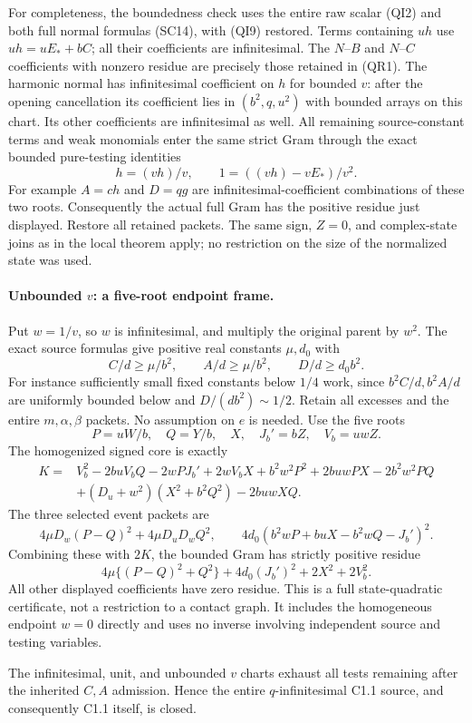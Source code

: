 For completeness, the boundedness check uses the entire raw scalar
(QI2) and both full normal formulas (SC14), with (QI9) restored.
Terms containing $u h$ use $u h=uE_*+bC$; all their coefficients
are infinitesimal. The $N$--$B$ and $N$--$C$ coefficients with
nonzero residue are precisely those retained in (QR1). The harmonic
normal has infinitesimal coefficient on $h$ for bounded $v$:
after the opening cancellation its coefficient lies in
$(b^2,q,u^2)$ with bounded arrays on this chart. Its other
coefficients are infinitesimal as well.
All remaining source-constant terms and weak monomials enter the
same strict Gram through the exact bounded pure-testing identities
\[
                   h=(vh)/v,\qquad
                   1=((vh)-vE_*)/v^2.
\]
For example $A=ch$ and $D=qg$ are infinitesimal-coefficient
combinations of these two roots. Consequently the actual full Gram
has the positive residue just displayed. Restore all retained
packets. The same sign, $Z=0$, and complex-state joins as in the
local theorem apply; no restriction on the size of the normalized
state was used.

\paragraph{Unbounded $v$: a five-root endpoint frame.}
Put $w=1/v$, so $w$ is infinitesimal, and multiply the original
parent by $w^2$. The exact source formulas give positive real
constants $\mu,d_0$ with
\[
 C/d\ge\mu/b^2,\qquad A/d\ge\mu/b^2,\qquad
 D/d\ge d_0 b^2.
\]
For instance sufficiently small fixed constants below $1/4$ work,
since $b^2C/d,b^2A/d$ are uniformly bounded below and
$D/(db^2)\sim1/2$. Retain all excesses and the entire $m,\alpha,
\beta$ packets. No assumption on $e$ is needed.
Use the five roots
\[
              P=uW/b,\quad Q=Y/b,\quad X,\quad J_b'=bZ,
                     \quad V_b=uwZ.
\]
The homogenized signed core is exactly
\begin{align*}
 K={}&V_b^2-2buV_bQ-2wPJ_b'+2wV_bX+b^2w^2P^2
       +2buwPX-2b^2w^2PQ\\
 &+(D_u+w^2)(X^2+b^2Q^2)-2buwXQ.
 \tag{QR2}
\end{align*}
The three selected event packets are
\[
 4\mu D_w(P-Q)^2+4\mu D_uD_wQ^2,
 \qquad
 4d_0(b^2wP+buX-b^2wQ-J_b')^2.
 \tag{QR3}
\]
Combining these with $2K$, the bounded Gram has strictly positive
residue
\[
 4\mu\{(P-Q)^2+Q^2\}+4d_0(J_b')^2+2X^2+2V_b^2.
\]
All other displayed coefficients have zero residue. This is a full
state-quadratic certificate, not a restriction to a contact graph.
It includes the homogeneous endpoint $w=0$ directly and uses no
inverse involving independent source and testing variables.

The infinitesimal, unit, and unbounded $v$ charts exhaust all tests
remaining after the inherited $C,A$ admission. Hence the entire
$q$-infinitesimal C1.1 source, and consequently C1.1 itself, is closed.
